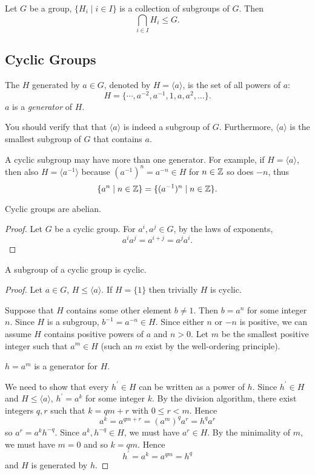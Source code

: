 \begin{corollary}
Let $G$ be a group, $\{H_i\mid i\in I\}$ is a collection of subgroups of $G$. Then
\[\bigcap_{i\in I}H_i\le G.\]
\end{corollary}

\subsection{Cyclic Groups}
\begin{definition}
The  $H$ generated by $a\in G$, denoted by $H=\langle a\rangle$, is the set of all powers of $a$:
\[H=\{\cdots,a^{-2},a^{-1},1,a,a^2,\dots\}.\]
$a$ is a \emph{generator} of $H$.
\end{definition}

You should verify that that $\langle a\rangle$ is indeed a subgroup of $G$. Furthermore, $\langle a\rangle$ is the smallest subgroup of $G$ that contains $a$.

\begin{remark}
A cyclic subgroup may have more than one generator. For example, if $H=\langle a\rangle$, then also $H=\langle a^{-1}\rangle$ because $(a^{-1})^n=a^{-n}\in H$ for $n\in\mathbb Z$ so does $-n$, thus
\[\{a^n\mid n\in\mathbb Z\}=\{(a^{-1})^n\mid n\in\mathbb Z\}.\] 
\end{remark}

\begin{lemma}
Cyclic groups are abelian.
\end{lemma}

\begin{proof}
Let $G$ be a cyclic group. For $a^i,a^j\in G$, by the laws of exponents,
\[a^i a^j=a^{i+j}=a^j a^i.\]
\end{proof}

\begin{proposition}
A subgroup of a cyclic group is cyclic.
\end{proposition}

\begin{proof}
Let $a\in G$, $H\le\langle a\rangle$. If $H=\{1\}$ then trivially $H$ is cyclic.

Suppose that $H$ contains some other element $b\neq1$. Then $b=a^n$ for some integer $n$. Since $H$ is a subgroup, $b^{-1}=a^{-n}\in H$. Since either $n$ or $-n$ is positive, we can assume $H$ contains positive powers of $a$ and $n>0$. Let $m$ be the smallest positive integer such that $a^m\in H$ (such an $m$ exist by the well-ordering principle).

\begin{claim}
$h=a^m$ is a generator for $H$.
\end{claim}

We need to show that every $h^\prime\in H$ can be written as a power of $h$. Since $h^\prime\in H$ and $H\le\langle a\rangle$, $h^\prime=a^k$ for some integer $k$. By the division algorithm, there exist integers $q,r$ such that $k=qm+r$ with $0\le r<m$. Hence
\[a^k=a^{qm+r}=(a^m)^q a^r=h^q a^r\]
so $a^r=a^k h^{-q}$. Since $a^k,h^{-q}\in H$, we must have $a^r\in H$. By the minimality of $m$, we must have $m=0$ and so $k=qm$. Hence
\[h^\prime=a^k=a^{qm}=h^q\]
and $H$ is generated by $h$.
\end{proof}

